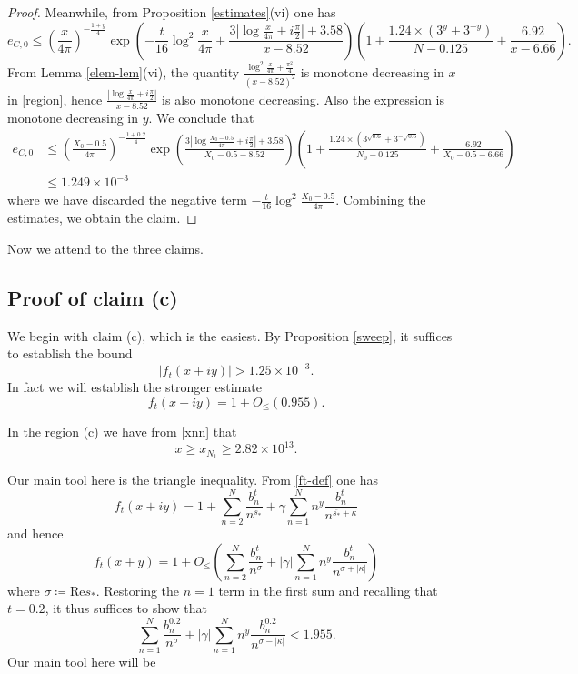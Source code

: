 \begin{proof}
Meanwhile, from Proposition \ref{estimates}(vi) one has
$$ e_{C,0} \leq \left(\frac{x}{4\pi}\right)^{-\frac{1+y}{4}} \exp\left( - \frac{t}{16} \log^2 \frac{x}{4\pi} + \frac{3 |\log \frac{x}{4\pi} + i \frac{\pi}{2}|+3.58}{x-8.52} \right) \left(1 + \frac{1.24 \times (3^y+3^{-y})}{N-0.125} + \frac{6.92}{x-6.66}\right).$$
From Lemma \ref{elem-lem}(vi), the quantity $\frac{\log^2 \frac{x}{4\pi} + \frac{\pi^2}{4}}{(x-8.52)^2}$ is monotone decreasing in $x$ in \eqref{region}, hence $\frac{|\log \frac{x}{4\pi} + i \frac{\pi}{2}|}{x-8.52}$ is also monotone decreasing.  Also the expression is monotone decreasing in $y$. We conclude that
\begin{equation}\label{ec0-bound}
\begin{split}
 e_{C,0} &\leq \left(\frac{X_0-0.5}{4\pi}\right)^{-\frac{1+0.2}{4}} \exp\left( \frac{3 |\log \frac{X_0-0.5}{4\pi} + i \frac{\pi}{2}|+3.58}{X_0-0.5-8.52} \right) \left(1 + \frac{1.24 \times (3^{\sqrt{0.6}}+3^{-\sqrt{0.6}})}{N_0-0.125} + \frac{6.92}{X_0-0.5-6.66}\right) \\
&\leq 1.249 \times 10^{-3}
\end{split}
\end{equation}
where we have discarded the negative term $- \frac{t}{16} \log^2 \frac{X_0-0.5}{4\pi}$.  Combining the estimates, we obtain the claim.
\end{proof}

Now we attend to the three claims.


\subsection{Proof of claim (c)}\label{c-bound}  

We begin with claim (c), which is the easiest.  
By Proposition \ref{sweep}, it suffices to establish the bound
$$ |f_t(x+iy)| > 1.25 \times 10^{-3}.$$
In fact we will establish the stronger estimate
\begin{equation}\label{ft0}
f_t(x+iy) = 1 + O_{\leq}( 0.955 ).
\end{equation}

In the region (c) we have from \eqref{xnn} that
$$ x \geq x_{N_1} \geq  2.82 \times 10^{13}.$$

Our main tool here is the triangle inequality.  From \eqref{ft-def} one has
$$
f_t(x+iy) = 1 + \sum_{n=2}^N \frac{b_n^t}{n^{s_*}} + \gamma \sum_{n=1}^N n^y \frac{b_n^t}{n^{\overline{s_*} + \kappa}}$$
and hence
$$ f_t(x+y) = 1 + O_{\leq}\left( \sum_{n=2}^N \frac{b_n^t}{n^{\sigma}} + |\gamma| \sum_{n=1}^N n^y \frac{b_n^t}{n^{\sigma + |\kappa|}} \right)$$
where $\sigma \coloneqq \mathrm{Re} s_*$.  Restoring the $n=1$ term in the first sum and recalling that $t=0.2$, it thus suffices to show that
\begin{equation}\label{nan}
 \sum_{n=1}^N \frac{b_n^{0.2}}{n^\sigma} + |\gamma| \sum_{n=1}^N n^y \frac{b_n^{0.2}}{n^{\sigma-|\kappa|}}
< 1.955.
\end{equation}
Our main tool here will be 

